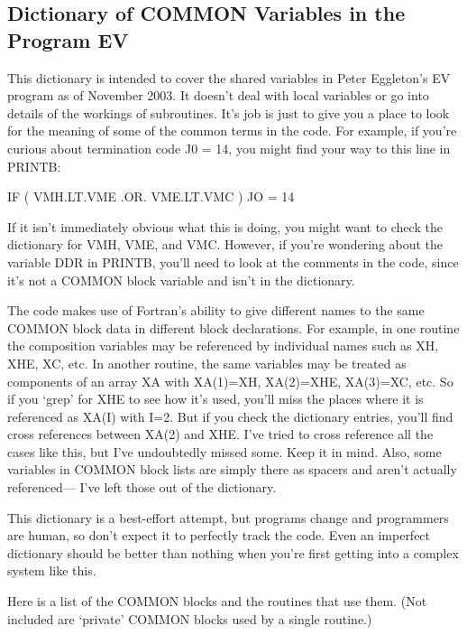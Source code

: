 \documentclass{article}
\begin{document}
\subsection*{ Dictionary of COMMON Variables in the Program EV}

This dictionary is intended to cover the shared variables in 
Peter Eggleton's EV program as of November 2003.
	It doesn't deal with local variables or go into details of the
	workings of subroutines.  It's job is just to give you a place to
	look for the meaning of some of the common terms in the code.
	For example, if you're curious about termination code J0 = 14,
	you might find your way to this line in PRINTB:
         \begin{center} IF ( VMH.LT.VME .OR. VME.LT.VMC ) JO = 14\end{center}
	If it isn't immediately obvious what this is doing, you might want to 
	check the dictionary for VMH, VME, and VMC.  However, if you're wondering about
	the variable DDR in PRINTB, you'll need to look at the comments in the code, since it's not
	a COMMON block variable and isn't in the dictionary.

The code makes use of Fortran's ability to give different
names to the same COMMON block data in different block declarations.
For example, in one routine the composition variables may be referenced by 
individual names such as XH, XHE, XC, etc.  In another routine, the same
variables may be treated as components of an array XA with XA(1)=XH,
XA(2)=XHE, XA(3)=XC, etc.  So if you `grep' for XHE to see how it's used,
you'll miss the places where it is referenced as XA(I) with I=2.
But if you check the dictionary entries, you'll find cross references
between XA(2) and XHE.  I've tried to cross reference all the cases like this,
but I've undoubtedly missed some.  Keep it in mind.  Also,
some variables in COMMON block lists are simply there as spacers and aren't
actually referenced--- I've left those out of the dictionary.

This dictionary is a best-effort attempt, but programs change and programmers
are human, so don't expect it to perfectly track the code.
Even an imperfect dictionary should be better than nothing when you're first
getting into a complex system like this.

Here is a list of the COMMON blocks and the routines that use them.
(Not included are `private' COMMON blocks used by a single routine.)
\end{document}

